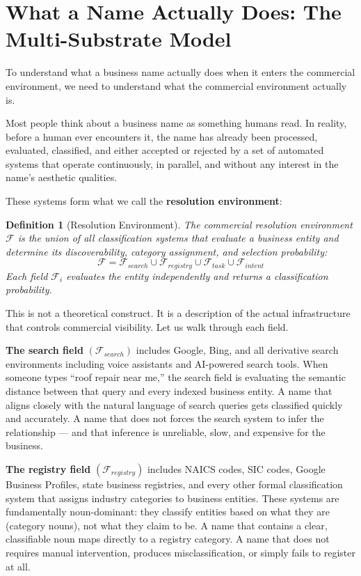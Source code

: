 \documentclass[12pt, openany]{book}
\theoremstyle{thmstyle}
\theoremstyle{defstyle}
\newtheorem{definition}{Definition}[chapter]
\begin{document}
\section{What a Name Actually Does: The Multi-Substrate Model}

To understand what a business name actually does when it enters the commercial environment, we need to understand what the commercial environment actually is.

Most people think about a business name as something humans read. In reality, before a human ever encounters it, the name has already been processed, evaluated, classified, and either accepted or rejected by a set of automated systems that operate continuously, in parallel, and without any interest in the name's aesthetic qualities.

These systems form what we call the \textbf{resolution environment}:

\begin{definition}[Resolution Environment]
The commercial resolution environment $\mathcal{F}$ is the union of all classification systems that evaluate a business entity and determine its discoverability, category assignment, and selection probability:
\[
\mathcal{F} = \mathcal{F}_{search} \cup \mathcal{F}_{registry} \cup \mathcal{F}_{task} \cup \mathcal{F}_{intent}
\]
Each field $\mathcal{F}_i$ evaluates the entity independently and returns a classification probability.
\end{definition}

This is not a theoretical construct. It is a description of the actual infrastructure that controls commercial visibility. Let us walk through each field.

\textbf{The search field} $(\mathcal{F}_{search})$ includes Google, Bing, and all derivative search environments including voice assistants and AI-powered search tools. When someone types ``roof repair near me,'' the search field is evaluating the semantic distance between that query and every indexed business entity. A name that aligns closely with the natural language of search queries gets classified quickly and accurately. A name that does not forces the search system to infer the relationship --- and that inference is unreliable, slow, and expensive for the business.

\textbf{The registry field} $(\mathcal{F}_{registry})$ includes NAICS codes, SIC codes, Google Business Profiles, state business registries, and every other formal classification system that assigns industry categories to business entities. These systems are fundamentally noun-dominant: they classify entities based on what they are (category nouns), not what they claim to be. A name that contains a clear, classifiable noun maps directly to a registry category. A name that does not requires manual intervention, produces misclassification, or simply fails to register at all.
\end{document}
